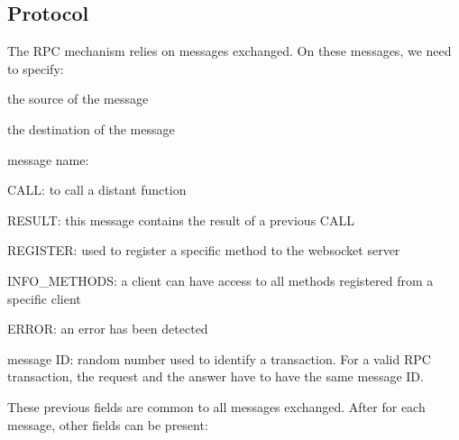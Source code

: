 \documentclass[pdftex,10pt,a4paper]{report}
\newenvironment{packed_item}{
\begin{itemize}
  \setlength{\itemsep}{1pt}
  \setlength{\parskip}{0pt}
  \setlength{\parsep}{0pt}
}{\end{itemize}}
\begin{document}
\subsection{Protocol}
The RPC mechanism relies on messages exchanged. On these messages, we need to specify:
\begin{packed_item}
	\item the source of the message
	\item the destination of the message
	\item message name:
		\begin{packed_item}
			\item CALL: to call a distant function
			\item RESULT: this message contains the result of a previous CALL
			\item REGISTER: used to register a specific method to the websocket server
			\item INFO\_METHODS: a client can have access to all methods registered from a specific client
			\item ERROR: an error has been detected
		\end{packed_item}
	\item message ID: random number used to identify a transaction. For a valid RPC transaction, the request and the answer have to have the same message ID.
\end{packed_item}

These previous fields are common to all messages exchanged. After for each message, other fields can be present:
\end{document}
